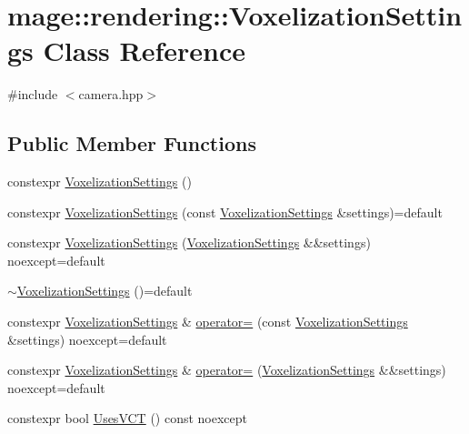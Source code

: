 \hypertarget{classmage_1_1rendering_1_1_voxelization_settings}{}\section{mage\+:\+:rendering\+:\+:Voxelization\+Settings Class Reference}
\label{classmage_1_1rendering_1_1_voxelization_settings}


{\ttfamily \#include $<$camera.\+hpp$>$}

\subsection*{Public Member Functions}
\begin{DoxyCompactItemize}
\item 
constexpr \hyperlink{classmage_1_1rendering_1_1_voxelization_settings_a5c866be104571097091b07f113b2f680}{Voxelization\+Settings} ()
\item 
constexpr \hyperlink{classmage_1_1rendering_1_1_voxelization_settings_a62f8755e86da892cd22467309fecfe95}{Voxelization\+Settings} (const \hyperlink{classmage_1_1rendering_1_1_voxelization_settings}{Voxelization\+Settings} \&settings)=default
\item 
constexpr \hyperlink{classmage_1_1rendering_1_1_voxelization_settings_af706582ce61228cd994aa72c537aa020}{Voxelization\+Settings} (\hyperlink{classmage_1_1rendering_1_1_voxelization_settings}{Voxelization\+Settings} \&\&settings) noexcept=default
\item 
\hyperlink{classmage_1_1rendering_1_1_voxelization_settings_aa9593796b2dd3b9d3a8f6b00ba225778}{$\sim$\+Voxelization\+Settings} ()=default
\item 
constexpr \hyperlink{classmage_1_1rendering_1_1_voxelization_settings}{Voxelization\+Settings} \& \hyperlink{classmage_1_1rendering_1_1_voxelization_settings_ae21513856299e74c147c5d347b36961a}{operator=} (const \hyperlink{classmage_1_1rendering_1_1_voxelization_settings}{Voxelization\+Settings} \&settings) noexcept=default
\item 
constexpr \hyperlink{classmage_1_1rendering_1_1_voxelization_settings}{Voxelization\+Settings} \& \hyperlink{classmage_1_1rendering_1_1_voxelization_settings_a96ea5fa3e2a8bdab0b4835caa11bd13f}{operator=} (\hyperlink{classmage_1_1rendering_1_1_voxelization_settings}{Voxelization\+Settings} \&\&settings) noexcept=default
\item 
constexpr bool \hyperlink{classmage_1_1rendering_1_1_voxelization_settings_a50ce0473e8e9fd22527d4f295c023176}{Uses\+V\+CT} () const noexcept

\end{DoxyCompactItemize}
